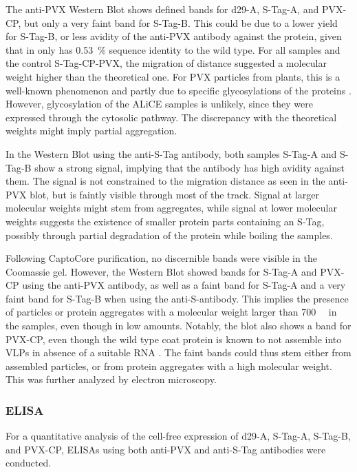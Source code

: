 The anti-PVX Western Blot shows defined bands for d29-A, S-Tag-A, and PVX-CP, but only a very faint band for S-Tag-B. This could be due to a lower yield for S-Tag-B, or less avidity of the anti-PVX antibody against the protein, given that in only has \SI{0.53}{\percent} sequence identity to the wild type. For all samples and the control S-Tag-CP-PVX, the migration of distance suggested a molecular weight higher than the theoretical one. For PVX particles from plants, this is a well-known phenomenon and partly due to specific glycosylations of the proteins \cite{pvx_glycosylation}. However, glycosylation of the ALiCE samples is unlikely, since they were expressed through the cytosolic pathway. The discrepancy with the theoretical weights might imply partial aggregation.  

In the Western Blot using the anti-S-Tag antibody, both samples S-Tag-A and S-Tag-B show a strong signal, implying that the antibody has high avidity against them. The signal is not constrained to the migration distance as seen in the anti-PVX blot, but is faintly visible through most of the track. Signal at larger molecular weights might stem from aggregates, while signal at lower molecular weights suggests the existence of smaller protein parts containing an S-Tag, possibly through partial degradation of the protein while boiling the samples. 

Following CaptoCore purification, no discernible bands were visible in the Coomassie gel. However, the Western Blot showed bands for S-Tag-A and PVX-CP using the anti-PVX antibody, as well as a faint band for S-Tag-A and a very faint band for S-Tag-B when using the anti-S-antibody. This implies the presence of particles or protein aggregates with a molecular weight larger than \SI{700}{\kilo\Dalton} in the samples, even though in low amounts. Notably, the blot also shows a band for PVX-CP, even though the wild type coat protein is known to not assemble into VLPs in absence of a suitable RNA \cite{pvx_assembly}. The faint bands could thus stem either from assembled particles, or from protein aggregates with a high molecular weight. This was further analyzed by electron microscopy.


\subsubsection{ELISA}
For a quantitative analysis of the cell-free expression of d29-A, S-Tag-A, S-Tag-B, and PVX-CP, ELISAs using both anti-PVX and anti-S-Tag antibodies were conducted. 

